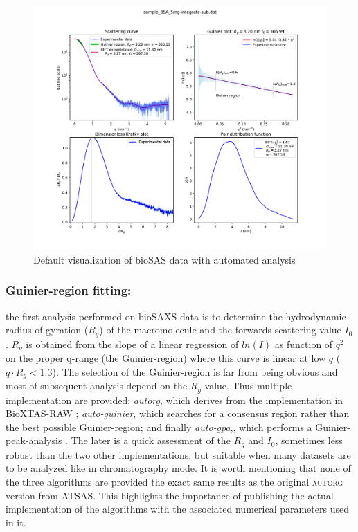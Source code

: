 \documentclass[preprint]{iucr}              %
\begin{document}
\begin{figure}
\label{plot}
\begin{center}
\includegraphics[width=12cm]{Figure_1}
\caption{Default visualization of bioSAS data with automated analysis}
\end{center}
\end{figure}


\subsubsection{Guinier-region fitting:}
the first analysis performed on bioSAXS data is to determine the hydrodynamic radius of gyration ($R_g$) of the macromolecule and the forwards scattering value $I_0$.
$R_g$ is obtained from the slope of a linear regression of $ln(I)$ as function of $q^2$ on the proper q-range (the Guinier-region) where this curve is linear at low $q$ ($q \cdot R_g<1.3$).
The selection of the Guinier-region is far from being obvious and most of subsequent analysis depend on the $R_g$ value.
Thus multiple implementation are provided: \textit{autorg}, which derives from the implementation in BioXTAS-RAW \cite{bioxtasraw}; \textit{auto-guinier}, which searches for a consensus region rather than the best possible Guinier-region; and finally \textit{auto-gpa},, which performs a Guinier-peak-analysis \cite{gpa}. 
The later is a quick assessment of the $R_g$ and $I_0$, sometimes less robust than the two other implementations, but suitable when many datasets are to be analyzed like in chromatography mode.
It is worth mentioning that none of the three algorithms are provided the exact same results as the original \textsc{autorg} \cite{ATSAS2} version from ATSAS. 
This highlights the importance of publishing the actual implementation of the algorithms with the associated numerical parameters used in it.
  
\end{document}
